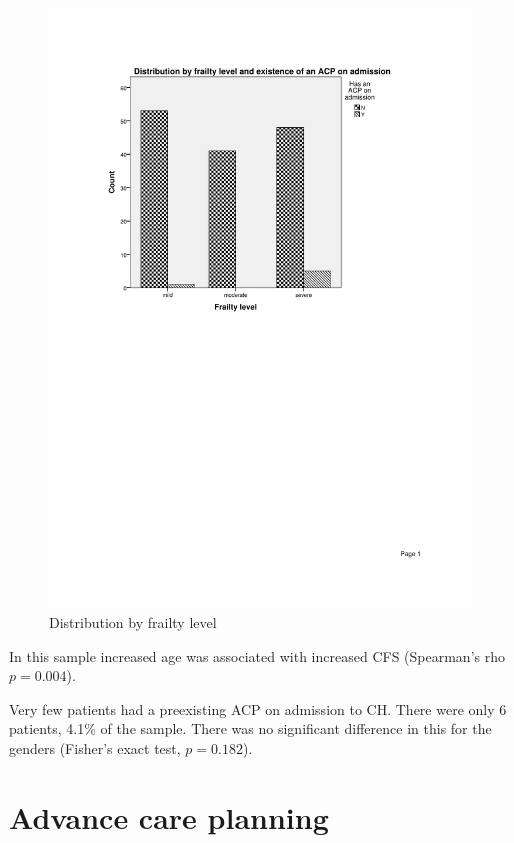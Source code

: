 \documentclass
[
	12pt,
	a4paper,
	oneside,
]{report}
\begin{document}
\begin{figure}[ht]
\caption{Distribution by frailty level}
\label{fig:chart-dist-frailty-level}
\includegraphics[width=\textwidth,
	trim={2.5cm 14cm 2.5cm 2.5cm},
	clip]{media/chart-dist-frailty-level}
\end{figure}

In this sample increased age was associated with increased CFS (Spearman's rho
$p=0.004$).

Very few patients had a preexisting ACP on admission to CH. There were only 6
patients, 4.1\% of the sample. There was no significant difference in this
for the genders (Fisher's exact test, $p=0.182$).


\section{Advance care planning}
\end{document}
